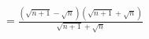 \documentclass[preview]{standalone}
\begin{document}
\begin{align*}
= \frac{ (\sqrt{n+1} - \sqrt{n}) (\sqrt{n+1} + \sqrt{n}) }{ \sqrt{n+1} + \sqrt{n} }
\end{align*}
\end{document}
